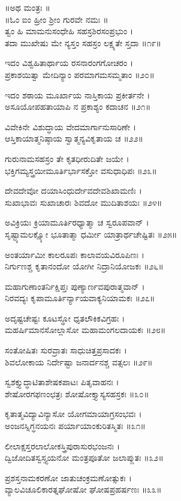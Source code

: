 ॥ಅಥ ಮಂತ್ರಃ ॥\\
॥ಓಂ ಐಂ ಹ್ರೀಂ ಶ್ರೀಂ ಗುರವೇ ನಮಃ ॥\\

ತ್ವಂ ಹಿ ಮಾಮನುಸಂಧೇಹಿ ಸಹಸ್ರಶಿರಸಂಪ್ರಭುಂ ।\\
ತದಾ ಮುಖೇಷು ಮೇ ನ್ಯಸ್ತಂ ಸಹಸ್ರಂ ಲಕ್ಷ್ಯತೇ ಸ್ತದಾ ॥೧೯॥

ಇದಂ ವಿಶ್ವಹಿತಾರ್ಥಾಯ ರಸನಾರಂಗಗೋಚರಂ ।\\
ಪ್ರಕಾಶಯಿತ್ವಾ ಮೇದಿನ್ಯಾಂ ಪರಮಾಗಮಸಮ್ಮತಾಂ ॥೨೦॥

ಇದಂ ಶಠಾಯ ಮೂರ್ಖಾಯ ನಾಸ್ತಿಕಾಯ ಪ್ರಕೀರ್ತನೇ ।\\
ಅಸೂಯೋಪಹತಾಯಾಪಿ ನ ಪ್ರಕಾಶ್ಯಂ ಕದಾಚನ ॥೨೧॥

ವಿವೇಕಿನೇ ವಿಶುದ್ಧಾಯ ವೇದಮಾರ್ಗಾನುಸಾರಿಣೇ ।\\
ಆಸ್ತಿಕಾಯಾತ್ಮನಿಷ್ಠಾಯ ಸ್ವಾತ್ಮನ್ಯವಿಕೃತಾಯ ಚ ॥೨೨॥

ಗುರುನಾಮಸಹಸ್ರಂ ತೇ ಕೃತಧೀರುದಿತೇ ಜಯೇ ।\\
ಭಕ್ತಿಗಮ್ಯಸ್ತ್ರಯೀಮೂರ್ತಿರ್ಭಾಸಕ್ತೋ ವಸುಧಾಧಿಪಃ ॥೨೩॥

ದೇವದೇವೋ ದಯಾಸಿಂಧುರ್ದೇವದೇವಶಿಖಾಮಣಿಃ ।\\
ಸುಖಾಭಾವಃ ಸುಖಾಚಾರಃ ಶಿವದೋ ಮುದಿತಾಶಯಃ ॥೨೪॥

ಅವಿಕ್ರಿಯಃ ಕ್ರಿಯಾಮೂರ್ತಿರಧ್ಯಾತ್ಮಾ ಚ ಸ್ವರೂಪವಾನ್ ।\\
ಸೃಷ್ಟ್ಯಾಮಲಕ್ಷ್ಯೋ ಭೂತಾತ್ಮಾ ಧರ್ಮೀ ಯಾತ್ರಾರ್ಥಚೇಷ್ಟಿತಃ ॥೨೫॥

ಅಂತರ್ಯಾಮೀ ಕಾಲರೂಪಃ ಕಾಲಾವಯವಿರೂಪಿಣಃ ।\\
ನಿರ್ಗುಣಶ್ಚ ಕೃತಾನಂದೋ ಯೋಗೀ ನಿದ್ರಾನಿಯೋಜಕಃ ॥೨೬॥

ಮಹಾಗುಣಾಂತರ್ನಿಕ್ಷಿಪ್ತಃ ಪುಣ್ಯಾರ್ಣವಪುರಾತ್ಮವಾನ್ ।\\
ನಿರವದ್ಯಃ ಕೃಪಾಮೂರ್ತಿರ್ನ್ಯಾಯವಾಕ್ಯನಿಯಾಮಕಃ ॥೨೭॥

ಅದೃಷ್ಟಚೇಷ್ಟಃ ಕೂಟಸ್ಥೋ ಧೃತಲೌಕಿಕವಿಗ್ರಹಃ ।\\
ಮಹರ್ಷಿಮಾನಸೋಲ್ಲಾಸೋ ಮಹಾಮಂಗಲದಾಯಕಃ ॥೨೮॥

ಸಂತೋಷಿತಃ ಸುರವ್ರಾತಃ ಸಾಧುಚಿತ್ತಪ್ರಸಾದಕಃ ।\\
ಶಿವಲೋಕಾಯ ನಿರ್ದೇಷ್ಟಾ ಜನಾರ್ದನಶ್ಚ ವತ್ಸಲಃ ॥೨೯॥

ಸ್ವಶಕ್ತ್ಯುದ್ಧಾಟಿತಾಶೇಷಕಪಾಟಃ ಪಿತೃವಾಹನಃ ।\\
ಶೇಷೋರಗಫಣಂಛತ್ರಃ ಶೋಷೋಕ್ತ್ಯಾಸ್ಯಸಹಸ್ರಕಃ ॥೩೦॥

ಕೃತಾತ್ಮವಿದ್ಯಾವಿನ್ಯಾಸೋ ಯೋಗಮಾಯಾಗ್ರಸಂಭವಃ ।\\
ಅಂಜನಸ್ನಿಗ್ಧನಯನಃ ಪರ್ಯಾಯಾಂಕುರಿತಸ್ಮಿತಃ ॥೩೧॥

ಲೀಲಾಕ್ಷಸ್ತರಲಾಲೋಕಸ್ತ್ರಿಪುರಾಸುರಭಂಜನಃ ।\\
ದ್ವಿಜೋದಿತಸ್ವಸ್ತ್ಯಯನೋ ಮಂತ್ರಪೂತೋ ಜಲಾಪ್ಲುತಃ ॥೩೨॥

ಪ್ರಶಸ್ತನಾಮಕರಣೋ ಜಾತುಚಂಕ್ರಮಣೋತ್ಸುಕಃ ।\\
ವ್ಯಾಲವಿಚೂಲಿಕಾರತ್ನಘೋಷೋ ಘೋಷಪ್ರಹರ್ಷಣಃ ॥೩೩॥

